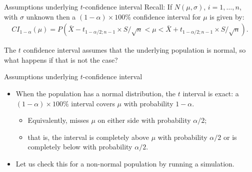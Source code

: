 \documentclass[
  ignorenonframetext,
]{beamer}
\providecommand{\tightlist}{%
  \setlength{\itemsep}{0pt}\setlength{\parskip}{0pt}}
\begin{document}
\begin{frame}{Assumptions underlying \(t\)-confidence interval}
\label{assumptions-underlying-t-confidence-interval}
Recall: If \(N(\mu, \sigma)\), \(i=1,\ldots, n\), with \(\sigma\)
unknown then a \((1-\alpha)\times 100\%\) confidence interval for
\(\mu\) is given by: \[\begin{array}{ll}
CI_{1-\alpha}(\mu)=P\left(\bar{X}-t_{1-\alpha/2;n-1}\times S/\sqrt{n}<\mu<\bar{X}+t_{1-\alpha/2;n-1}\times S/\sqrt{n}\right).
\end{array}\]

The \(t\) confidence interval assumes that the underlying population is
normal, so what happens if that is not the case?
\end{frame}

\begin{frame}{Assumptions underlying \(t\)-confidence interval}
\label{assumptions-underlying-t-confidence-interval-1}
\begin{itemize}
\item
  When the population has a normal distribution, the \(t\) interval is
  exact: a \((1-\alpha)\times 100\%\) interval covers \(\mu\) with
  probability \(1-\alpha\).

  \begin{itemize}
  \tightlist
  \item
    Equivalently, misses \(\mu\) on either side with probability
    \(\alpha/2\);
  \item
    that is, the interval is completely above \(\mu\) with probability
    \(\alpha/2\) or is completely below with probability \(\alpha/2\).
  \end{itemize}
\item
  Let us check this for a non-normal population by running a simulation.
\end{itemize}
\end{frame}
\end{document}
